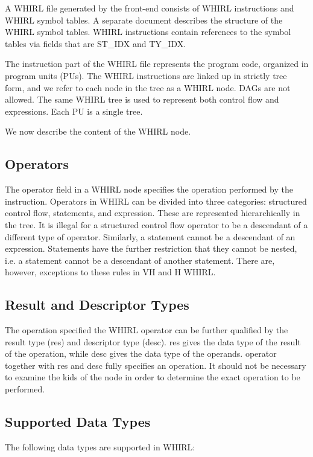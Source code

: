 A WHIRL file generated by the front-end consists of WHIRL instructions
and WHIRL symbol tables. A separate document describes the structure of the WHIRL symbol tables. WHIRL instructions
contain references to the symbol tables via fields that are ST\_IDX
and TY\_IDX. 

The instruction part of the WHIRL file represents the
program code, organized in program units (PUs). The WHIRL instructions
are linked up in strictly tree form, and we refer to each node in
the tree as a WHIRL node. DAGs are not allowed. The same WHIRL tree
is used to represent both control flow and expressions. Each PU is
a single tree. 

We now describe the content of the WHIRL node.

\subsection{Operators}

The operator field in a WHIRL node specifies the operation performed by
the instruction. Operators in WHIRL can be divided into three
categories: structured control flow, statements, and expression.
These are represented hierarchically in the tree. It is illegal
for a structured control flow operator to be a descendant of a
different type of operator. Similarly, a statement cannot be a
descendant of an expression. Statements have the further restriction
that they cannot be nested, i.e. a statement cannot be a  descendant
of another statement. There are, however, exceptions to these rules
in VH and H WHIRL.

\subsection{Result and Descriptor Types}

The operation specified the WHIRL operator can be further qualified
by the result type (res) and descriptor type (desc). res gives the
data type of the result of the operation, while desc gives the data
type of the operands. operator together with res and desc fully
specifies an operation. It should not be necessary to examine the
kids of the node in order to determine the exact operation to be
performed.

\subsection{Supported Data Types}

The following data types are supported in WHIRL:

